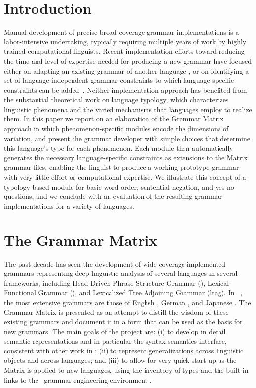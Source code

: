 \section{Introduction}
Manual development of precise broad-coverage grammar implementations
is a labor-intensive undertaking, typically requiring multiple years
of work by highly trained computational linguists.  Recent implementation
efforts toward reducing the time and level of expertise needed for producing
a new grammar have focused either on adapting an existing grammar of another language \cite{Butt-et-al-02,Kim:Dal:Kap:Kin:Mas:Ohk:03,Bat:Kru:Kru:ta}, or
on identifying a set of language-independent grammar constraints to
which language-specific constraints can be added~\cite{Ben:Fli:Oe:02}.
Neither implementation approach has benefited from the substantial
theoretical work on language typology, which characterizes linguistic
phenomena and the varied mechanisms that languages employ to realize
them.  In this paper we report on an elaboration of the Grammar Matrix
approach in which phenomenon-specific modules encode the dimensions of
variation, and present the grammar developer with simple choices that
determine this language's type for each phenomenon. Each module then
automatically generates the necessary language-specific constraints as
extensions to the Matrix grammar files, enabling the linguist to
produce a working prototype grammar with very little effort or
computational expertise.  We illustrate this concept of a
typology-based module for basic word
order, sentential negation, and yes-no questions, and we conclude with
an evaluation of the resulting grammar implementations for a variety
of languages.

\section{The Grammar Matrix}

The past decade has seen the development of wide-coverage implemented
grammars representing deep linguistic analysis of several languages in
several frameworks, including Head-Driven Phrase Structure Grammar
(\hpsg), Lexical-Functional Grammar (\lfg), and Lexicalized Tree
Adjoining Grammar ({\sc ltag}). In \hpsg\ \cite{Pol:Sag:94}, the most
extensive grammars are those of English \cite{Flickinger:00}, German
\cite{Mue:Kap:00}, and Japanese \cite{Siegel:00,Siegel:Bender:02}.
The Grammar Matrix \cite{Ben:Fli:Oe:02} is presented as 
an attempt to distill the
wisdom of these existing grammars and document it in a form that can
be used as the basis for new grammars. The main goals of the project
are: (i) to develop in detail semantic representations and in particular 
the syntax-semantics interface, consistent with other work in \hpsg; 
(ii) to represent generalizations across linguistic objects
and across languages; and (iii) to allow for very quick start-up as 
the Matrix is applied to new languages, using the inventory of types and
the built-in links to the \lkb\ grammar engineering environment
\cite{Copestake:02}.

